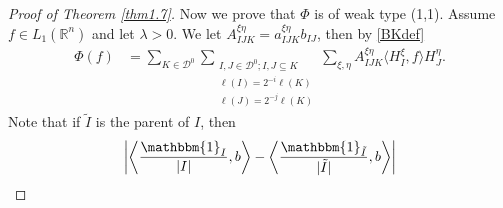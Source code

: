 \documentclass[oneside,english,a4wide]{amsart}
\numberwithin{equation}{section}
\numberwithin{figure}{section}
\theoremstyle{plain}
\theoremstyle{plain}
\theoremstyle{definition}
\theoremstyle{plain}
\theoremstyle{remark}
\theoremstyle{definition}
\theoremstyle{remark}
\theoremstyle{definition}
\newcommand{\8}{\infty}
\begin{document}
\begin{proof}[Proof of Theorem \ref{thm1.7}]
Now we prove that $\varPhi$ is of weak type (1,1). Assume $f\in L_1(\mathbb{R}^n)$ and let $\lambda>0$. We let $A_{IJK}^{\xi\eta}=a_{IJK}^{\xi\eta}b_{IJ}$,
then by \eqref{BKdef}
\begin{equation}
	\begin{aligned}
		\varPhi(f){}&
		=\sum_{K\in\mathcal{D}^0}\sum_{\substack{I,J\in\mathcal{D}^0;I,J\subseteq K\\ \ell(I)=2^{-i}\ell(K)\\\ell(J)=2^{-j}\ell(K)}}\sum_{\xi,\eta}A_{IJK}^{\xi\eta}\langle H^\xi_I,f\rangle H^\eta_J.
	\end{aligned}
\end{equation}
Note that if $\tilde{I}$ is the parent of $I$, then
\begin{equation*}
	\begin{aligned}
		\bigg|\biggl\langle \frac{\mathbbm{1}_I}{|I|},b\biggr\rangle-\biggl\langle\frac{\mathbbm{1}_{\tilde{I}}}{|\tilde{I}|},b\biggr\rangle\bigg|{}

\end{aligned}
\end{equation*}
\end{proof}
\end{document}
